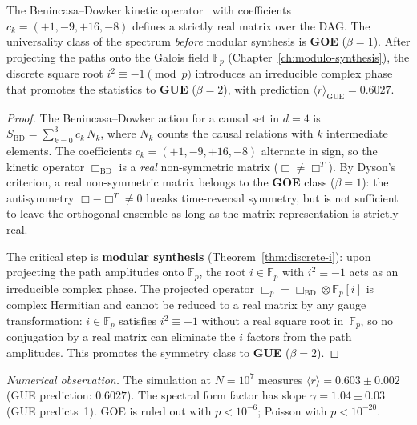 \begin{theorem}
\label{thm:gue-spectral}
The Benincasa--Dowker kinetic operator~\cite{benincasa2010} with
coefficients $c_k = (+1, -9, +16, -8)$ defines a strictly real matrix
over the DAG. The universality class of the spectrum \emph{before}
modular synthesis is \textbf{GOE} ($\beta = 1$). After projecting the
paths onto the Galois field $\mathbb{F}_p$
(Chapter~\ref{ch:modulo-synthesis}), the discrete square root
$i^2 \equiv -1 \pmod{p}$ introduces an irreducible complex phase that
promotes the statistics to \textbf{GUE} ($\beta = 2$), with prediction
$\langle r \rangle_{\mathrm{GUE}} = 0{.}6027$.
\end{theorem}

\begin{proof}
The Benincasa--Dowker action for a causal set in $d = 4$ is
$S_{\mathrm{BD}} = \sum_{k=0}^{3} c_k\,N_k$, where $N_k$ counts the
causal relations with $k$ intermediate elements. The coefficients
$c_k = (+1, -9, +16, -8)$ alternate in sign, so the kinetic operator
$\Box_{\mathrm{BD}}$ is a \emph{real} non-symmetric matrix
($\Box \neq \Box^T$). By Dyson's criterion, a real non-symmetric matrix
belongs to the \textbf{GOE} class ($\beta = 1$): the antisymmetry
$\Box - \Box^T \neq 0$ breaks time-reversal symmetry, but is not
sufficient to leave the orthogonal ensemble as long as the matrix
representation is strictly real.

The critical step is \textbf{modular synthesis}
(Theorem~\ref{thm:discrete-i}): upon projecting the path amplitudes onto
$\mathbb{F}_p$, the root $i \in \mathbb{F}_p$ with
$i^2 \equiv -1$ acts as an irreducible complex phase. The projected
operator $\Box_p = \Box_{\mathrm{BD}} \otimes \mathbb{F}_p[i]$ is
complex Hermitian and cannot be reduced to a real matrix by any gauge
transformation: $i \in \mathbb{F}_p$ satisfies
$i^2 \equiv -1$ without a real square root in~$\mathbb{F}_p$, so no
conjugation by a real matrix can eliminate the $i$ factors from the path
amplitudes. This promotes the symmetry class to \textbf{GUE}
($\beta = 2$).
\end{proof}

\noindent\textit{Numerical observation.}\enspace
The simulation at $N = 10^7$ measures
$\langle r \rangle = 0{.}603 \pm 0{.}002$
(GUE prediction: $0{.}6027$).
The spectral form factor has slope
$\gamma = 1{.}04 \pm 0{.}03$ (GUE predicts~1). GOE is ruled out with
$p < 10^{-6}$; Poisson with $p < 10^{-20}$.

